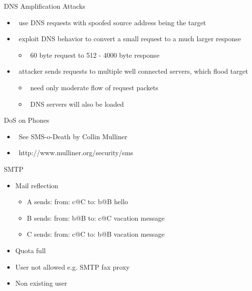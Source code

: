 \documentclass{beamer}
\begin{document}
\begin{frame}{DNS Amplification Attacks }
  \begin{itemize}
  \item  use DNS requests with spoofed source 
    address being the target 
  \item  exploit DNS behavior to convert a small 
    request to a much larger response 
    \begin{itemize}
    \item  60 byte request to 512 - 4000 byte response 
    \end{itemize}
  \item  attacker sends requests to multiple well 
    connected servers, which flood target 
    \begin{itemize}
    \item  need only moderate flow of request packets 
    \item  DNS servers will also be loaded 
    \end{itemize}
  \end{itemize}
\end{frame}



\begin{frame}{DoS on Phones}
  \begin{itemize}
  \item  See SMS-o-Death by Collin Mulliner 
  \item  http://www.mulliner.org/security/sms
  \end{itemize}
\end{frame}


\begin{frame}{SMTP}
  \begin{itemize}
  \item Mail reflection
  \begin{itemize}
  \item A sends: from: c@C to: b@B hello
  \item B sends: from: b@B to: c@C vacation message
  \item C sends: from: c@C to: b@B vacation message
  \end{itemize}
  \item<2-> Quota full
  \item<3-> User not allowed e.g. SMTP fax proxy
  \item<4-> Non existing user
  \end{itemize}
\end{frame}
\end{document}
